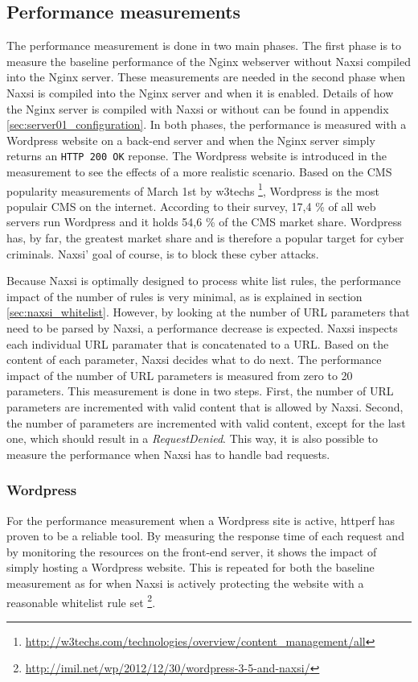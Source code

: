 \documentclass[Methods]{subfiles}
\begin{document}
\subsection{Performance measurements}
The performance measurement is done in two main phases. The first phase is to measure the baseline performance of the Nginx webserver without Naxsi compiled into the Nginx server. These measurements are needed in the second phase when Naxsi is compiled into the Nginx server and when it is enabled. Details of how the Nginx server is compiled with Naxsi or without can be found in appendix \ref{sec:server01_configuration}. In both phases, the performance is measured with a Wordpress website on a back-end server and when the Nginx server simply returns an \verb+HTTP 200 OK+ reponse. The Wordpress website is introduced in the measurement to see the effects of a more realistic scenario. Based on the \ac{CMS} popularity measurements of March 1st by w3techs \footnote{\url{http://w3techs.com/technologies/overview/content_management/all}}, Wordpress is the most populair \ac{CMS} on the internet. According to their survey, 17,4 \% of all web servers run Wordpress and it holds 54,6 \% of the CMS market share. Wordpress has, by far, the greatest market share and is therefore a popular target for cyber criminals. Naxsi' goal of course, is to block these cyber attacks.

Because Naxsi is optimally designed to process white list rules, the performance impact of the number of rules is very minimal, as is explained in section \ref{sec:naxsi_whitelist}. However, by looking at the number of \ac{URL} parameters that need to be parsed by Naxsi, a performance decrease is expected. Naxsi inspects each individual \ac{URL} paramater that is concatenated to a \ac{URL}. Based on the content of each parameter, Naxsi decides what to do next. The performance impact of the number of \ac{URL} parameters is measured from zero to 20 parameters. This measurement is done in two steps. First, the number of \ac{URL} parameters are incremented with valid content that is allowed by Naxsi. Second, the number of parameters are incremented with valid content, except for the last one, which should result in a \textit{RequestDenied}. This way, it is also possible to measure the performance when Naxsi has to handle bad requests.

\subsubsection{Wordpress}
For the performance measurement when a Wordpress site is active, httperf has proven to be a reliable tool. By measuring the response time of each request and by monitoring the resources on the front-end server, it shows the impact of simply hosting a Wordpress website. This is repeated for both the baseline measurement as for when Naxsi is actively protecting the website with a reasonable whitelist rule set \footnote{\url{http://imil.net/wp/2012/12/30/wordpress-3-5-and-naxsi/}}.
\end{document}
